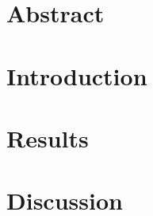 \documentclass[11pt, a4paper]{article}
\begin{document}
  \section{Abstract}
  \label{section:abstract}
  

  \newpage
  \section{Introduction}
  \label{section:intro}
  

  \section{Results}
  \label{section:results}
  

  \section{Discussion}
  \label{section:discuss}
  

  \printbibliography[heading=bibintoc]

  \newpage
  \listoftodos[Notes]
\end{document}

